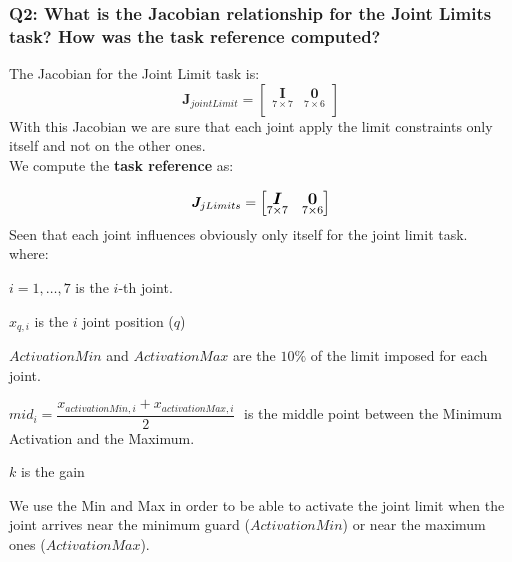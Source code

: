 \documentclass{article}
\begin{document}
\subsubsection{Q2: What is the Jacobian relationship for the Joint Limits task? How was the task reference computed?}
The Jacobian for the Joint Limit task is:
\begin{equation}
\boldsymbol{J}_{jointLimit}=
    \begin{bmatrix}
     \underset{7\times 7}{\boldsymbol{I}} & \underset{7\times6}{\boldsymbol{0}} \\
    \end{bmatrix}
\end{equation}
With this Jacobian we are sure that each joint apply the limit constraints only itself and not on the other ones.
\\
We compute the \textbf{task reference} as:

\begin{equation}
\large
\boldsymbol{J}_{jLimits} =
\begin{bmatrix}
\underset{7\times7}{\boldsymbol{I}} & \underset{7\times6}{\boldsymbol{0}}
\end{bmatrix}
\end{equation}
	Seen that each joint influences obviously only itself for the joint limit task.\\
	
	where:
	\begin{description}
		\item $i = 1,\dots,7$ is the $i$-th joint.
		\item $x_{q,i}$ is the $i$ joint position ($q$)
		\item $ActivationMin$ and $ActivationMax$ are the $10\%$ of the limit imposed for each joint.
		\item $mid_i = \dfrac{x_{activationMin,i} + x_{activationMax,i}}{2}\; $ is the middle point between the Minimum Activation and the Maximum.
		\item $k$ is the gain
	\end{description}
	We use the Min and Max in order to be able to activate the joint limit when the joint arrives near the minimum guard ($ActivationMin$) or near the maximum ones ($ActivationMax$).
\clearpage
\end{document}
